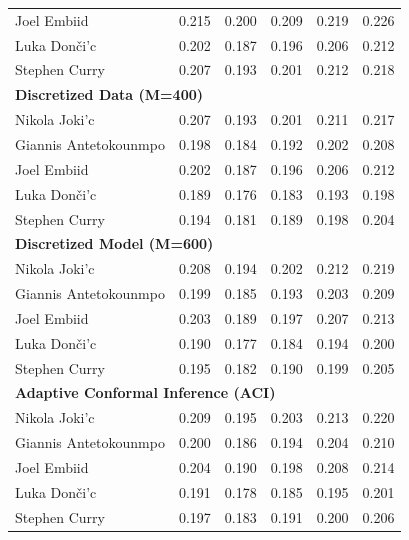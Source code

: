\documentclass[11pt,a4paper]{article}
\begin{document}
\begin{table}[H]
\begin{tabular}{lccccc}
Joel Embiid & 0.215 & 0.200 & 0.209 & 0.219 & 0.226 \\
Luka Don\v{c}i'{c} & 0.202 & 0.187 & 0.196 & 0.206 & 0.212 \\
Stephen Curry & 0.207 & 0.193 & 0.201 & 0.212 & 0.218 \\
\midrule
\multicolumn{6}{l}{\textbf{Discretized Data (M=400)}} \\
\midrule
Nikola Joki'{c} & 0.207 & 0.193 & 0.201 & 0.211 & 0.217 \\
Giannis Antetokounmpo & 0.198 & 0.184 & 0.192 & 0.202 & 0.208 \\
Joel Embiid & 0.202 & 0.187 & 0.196 & 0.206 & 0.212 \\
Luka Don\v{c}i'{c} & 0.189 & 0.176 & 0.183 & 0.193 & 0.198 \\
Stephen Curry & 0.194 & 0.181 & 0.189 & 0.198 & 0.204 \\
\midrule
\multicolumn{6}{l}{\textbf{Discretized Model (M=600)}} \\
\midrule
Nikola Joki'{c} & 0.208 & 0.194 & 0.202 & 0.212 & 0.219 \\
Giannis Antetokounmpo & 0.199 & 0.185 & 0.193 & 0.203 & 0.209 \\
Joel Embiid & 0.203 & 0.189 & 0.197 & 0.207 & 0.213 \\
Luka Don\v{c}i'{c} & 0.190 & 0.177 & 0.184 & 0.194 & 0.200 \\
Stephen Curry & 0.195 & 0.182 & 0.190 & 0.199 & 0.205 \\
\midrule
\multicolumn{6}{l}{\textbf{Adaptive Conformal Inference (ACI)}} \\
\midrule
Nikola Joki'{c} & 0.209 & 0.195 & 0.203 & 0.213 & 0.220 \\
Giannis Antetokounmpo & 0.200 & 0.186 & 0.194 & 0.204 & 0.210 \\
Joel Embiid & 0.204 & 0.190 & 0.198 & 0.208 & 0.214 \\
Luka Don\v{c}i'{c} & 0.191 & 0.178 & 0.185 & 0.195 & 0.201 \\
Stephen Curry & 0.197 & 0.183 & 0.191 & 0.200 & 0.206 \\
\bottomrule
\end{tabular}
\end{table}
\end{document}
